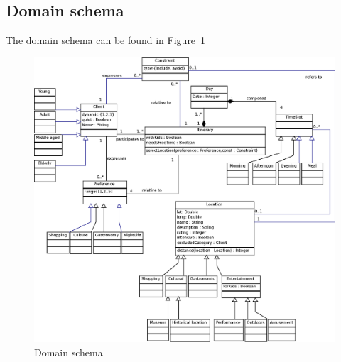 \documentclass[11pt]{article} %
\begin{document}

\subsection{Domain schema}
The domain schema can be found in Figure~\ref{fig:ClassDiagram}

\begin{figure}[h]
\centering
\includegraphics[width=\textwidth]{images/domain.eps}
\caption{Domain schema}
\label{fig:ClassDiagram}
\end{figure}
\end{document}
